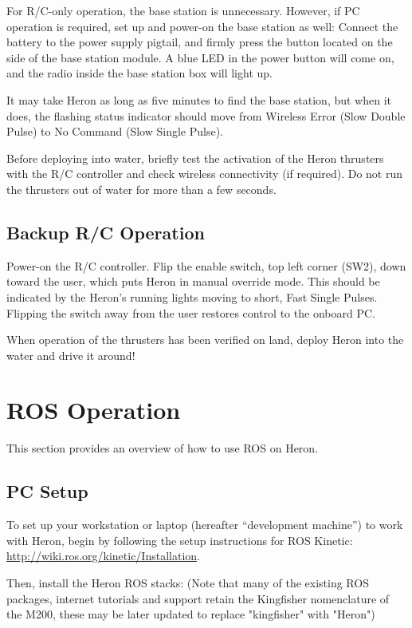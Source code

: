 \documentclass[]{clearpath-latex/clearpath-manual}
\begin{document}
For R/C-only operation, the base station is unnecessary. However, if PC operation is required, set up and power-on the base station as well: Connect the battery to the power supply pigtail, and firmly press the button located on the side of the base station module. A blue LED in the power button will come on, and the radio inside the base station box will light up.

It may take Heron as long as five minutes to find the base station, but when it does, the flashing status indicator should move from Wireless Error (Slow Double Pulse) to No Command (Slow Single Pulse).

Before deploying into water, briefly test the activation of the Heron thrusters with the R/C controller and check wireless connectivity (if required). Do not run the thrusters out of water for more than a few seconds.

\subsection{Backup R/C Operation} \label{backupoperation}
Power-on the R/C controller. Flip the enable switch, top left corner (SW2), down toward the user, which puts Heron in manual override mode. This should be indicated by the Heron's running lights moving to short, Fast Single Pulses. Flipping the switch away from the user restores control to the onboard PC.

When operation of the thrusters has been verified on land, deploy Heron into the water and drive it around!

\newpage

\section{ROS Operation}
This section provides an overview of how to use ROS on Heron.

\subsection{PC Setup} \label{pcsetup}

To set up your workstation or laptop (hereafter “development machine”) to work with Heron, begin by following the setup instructions for ROS Kinetic: \url{http://wiki.ros.org/kinetic/Installation}.

Then, install the Heron ROS stacks:
(Note that many of the existing ROS packages, internet tutorials and support retain the Kingfisher nomenclature of the M200, these may be later updated to replace "kingfisher" with "Heron")
\end{document}

